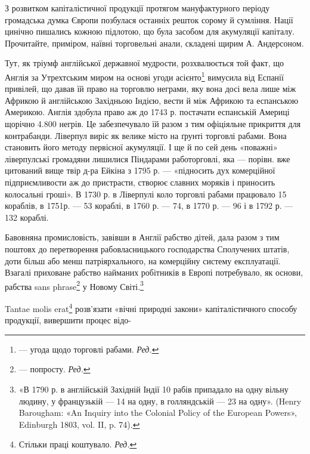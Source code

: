З розвитком капіталістичної продукції протягом мануфактурного
періоду громадська думка Європи позбулася останніх решток
сорому й сумління. Нації цинічно пишались кожною підлотою,
що була засобом для акумуляції капіталу. Прочитайте, приміром,
наївні торговельні анали, складені щирим А. Андерсоном.

Тут, як тріумф англійської державної мудрости, розхвалюється
той факт, що Англія за Утрехтським миром на основі
угоди асієнто\footnote*{
— угода щодо торговлі рабами. \emph{Ред.}
} вимусила від Еспанії привілей, що давав їй
право на торговлю неграми, яку вона досі вела лише між Африкою
й англійською Західньою Індією, вести й між Африкою та
еспанською Америкою. Англія здобула право аж до 1743 р. постачати
еспанській Америці щорічно 4.800 негрів. Це забезпечувало
їй разом з тим офіціяльне прикриття для контрабанди.
Ліверпул виріс як велике місто на ґрунті торговлі рабами.
Вона становить його методу первісної акумуляції. І ще й по сей
день «поважні» ліверпулські громадяни лишилися Піндарами
работорговлі, яка — порівн. вже цитований вище твір д-ра Ейкіна
з 1795 р. — «підносить дух комерційної підприємливости аж до
пристрасти, створює славних моряків і приносить колосальні
гроші». В 1730 р. в Ліверпулі коло торговлі рабами працювало
15 кораблів, в 1751р. — 53 кораблі, в 1760 р. — 74, в 1770 р. —
96 і в 1792 р. — 132 кораблі.

Бавовняна промисловість, завівши в Англії рабство дітей,
дала разом з тим поштовх до перетворення рабовласницького
господарства Сполучених штатів, доти більш або менш патріярхального,
на комерційну систему експлуатації. Взагалі приховане
рабство найманих робітників в Европі потребувало, як основи,
рабства sans phrase\footnote*{
— попросту. \emph{Ред.}
} у Новому Світі.\footnote{
«В 1790 р. в англійській Західній Індії 10 рабів припадало на
одну вільну людину, у французькій — 14 на одну, в голляндській — 23
на одну». (Henry Barougham: «An Inquiry into the Colonial Policy of
the European Powers», Edinburgh 1803, vol. II, p. 74).
}

Tantae molis erat\footnote*{
Стільки праці коштувало. \emph{Ред.}
} розв’язати «вічні природні закони»
капіталістичного способу продукції, вивершити процес відо-

